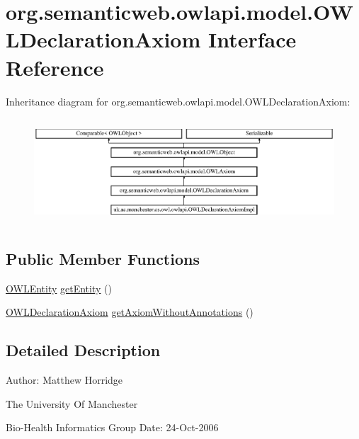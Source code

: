 \hypertarget{interfaceorg_1_1semanticweb_1_1owlapi_1_1model_1_1_o_w_l_declaration_axiom}{\section{org.\-semanticweb.\-owlapi.\-model.\-O\-W\-L\-Declaration\-Axiom Interface Reference}
\label{interfaceorg_1_1semanticweb_1_1owlapi_1_1model_1_1_o_w_l_declaration_axiom}
}
Inheritance diagram for org.\-semanticweb.\-owlapi.\-model.\-O\-W\-L\-Declaration\-Axiom\-:\begin{figure}[H]
\begin{center}
\leavevmode
\includegraphics[height=3.966006cm]{interfaceorg_1_1semanticweb_1_1owlapi_1_1model_1_1_o_w_l_declaration_axiom}
\end{center}
\end{figure}
\subsection*{Public Member Functions}
\begin{DoxyCompactItemize}
\item 
\hyperlink{interfaceorg_1_1semanticweb_1_1owlapi_1_1model_1_1_o_w_l_entity}{O\-W\-L\-Entity} \hyperlink{interfaceorg_1_1semanticweb_1_1owlapi_1_1model_1_1_o_w_l_declaration_axiom_a98c0998ab26e4c28eff01973cd61a1f9}{get\-Entity} ()
\item 
\hyperlink{interfaceorg_1_1semanticweb_1_1owlapi_1_1model_1_1_o_w_l_declaration_axiom}{O\-W\-L\-Declaration\-Axiom} \hyperlink{interfaceorg_1_1semanticweb_1_1owlapi_1_1model_1_1_o_w_l_declaration_axiom_a81a8037cbf9106b63b6e294649265eb3}{get\-Axiom\-Without\-Annotations} ()
\end{DoxyCompactItemize}


\subsection{Detailed Description}
Author\-: Matthew Horridge\par
 The University Of Manchester\par
 Bio-\/\-Health Informatics Group Date\-: 24-\/\-Oct-\/2006 

